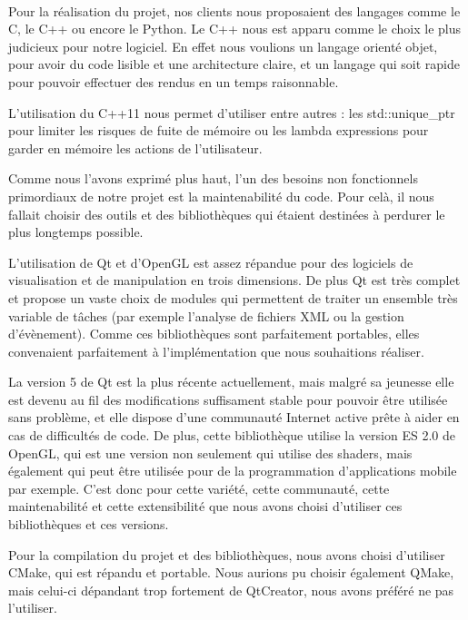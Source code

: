 \paragraph{}
        Pour la réalisation du projet, nos clients nous proposaient des langages comme le C, le C++ ou encore le Python. Le C++ nous est apparu comme le choix le plus judicieux pour notre logiciel. En effet nous voulions un langage orienté objet, pour avoir du code lisible et une architecture claire, et un langage qui soit rapide pour pouvoir effectuer des rendus en un temps raisonnable.
        
	L'utilisation du C++11 nous permet d'utiliser entre autres : les std::unique\_ptr pour limiter les risques de fuite de mémoire ou les lambda expressions pour garder en mémoire les actions de l'utilisateur.

    Comme nous l'avons exprimé plus haut, l'un des besoins non fonctionnels primordiaux de notre projet est la maintenabilité du code. Pour celà, il nous fallait choisir des outils et des bibliothèques qui étaient destinées à perdurer le plus longtemps possible.
    
    L'utilisation de Qt et d'OpenGL est assez répandue pour des logiciels de visualisation et de manipulation en trois dimensions. De plus Qt est très complet et propose un vaste choix de modules qui permettent de traiter un ensemble très variable de tâches (par exemple l'analyse de fichiers XML ou la gestion d'évènement). Comme ces bibliothèques sont parfaitement portables, elles convenaient parfaitement à l'implémentation que nous souhaitions réaliser.
    
    La version 5 de Qt est la plus récente actuellement, mais malgré sa jeunesse elle est devenu au fil des modifications suffisament stable pour pouvoir être utilisée sans problème, et elle dispose d'une communauté Internet active prête à aider en cas de difficultés de code. De plus, cette bibliothèque utilise la version ES 2.0 de OpenGL, qui est une version non seulement qui utilise des shaders, mais également qui peut être utilisée pour de la programmation d'applications mobile par exemple. C'est donc pour cette variété, cette communauté, cette maintenabilité et cette extensibilité que nous avons choisi d'utiliser ces bibliothèques et ces versions.

    Pour la compilation du projet et des bibliothèques, nous avons choisi d'utiliser CMake, qui est répandu et portable. Nous aurions pu choisir également QMake, mais celui-ci dépandant trop fortement de QtCreator, nous avons préféré ne pas l'utiliser.

